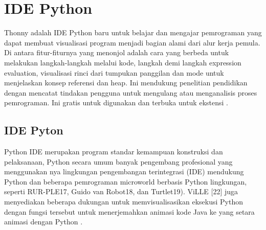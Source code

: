 

\section{IDE Python}
Thonny adalah IDE Python baru untuk belajar dan mengajar pemrograman
yang dapat membuat visualisasi program menjadi bagian alami dari alur kerja pemula.
Di antara fitur-fiturnya yang menonjol adalah cara yang berbeda untuk melakukan langkah-langkah melalui kode, langkah demi langkah expression evaluation, visualisasi rinci dari tumpukan panggilan dan mode untuk menjelaskan konsep referensi dan heap. Ini mendukung penelitian pendidikan dengan mencatat tindakan pengguna untuk mengulang atau menganalisis proses pemrograman. Ini gratis untuk digunakan dan terbuka untuk ekstensi \cite{annamaa2015introducing}.

\subsection{IDE Pyton}
Python IDE merupakan program standar kemampuan konstruksi dan pelaksanaan, Python secara umum banyak pengembang profesional yang menggunakan nya 
lingkungan pengembangan terintegrasi (IDE) mendukung
Python dan beberapa pemrograman microworld berbasis Python lingkungan, seperti RUR-PLE17, Guido van Robot18, dan Turtlet19). ViLLE [22] juga menyediakan beberapa dukungan untuk memvisualisasikan eksekusi Python dengan fungsi tersebut untuk menerjemahkan animasi kode Java ke yang setara animasi dengan Python \cite{helminen2010jype}.

